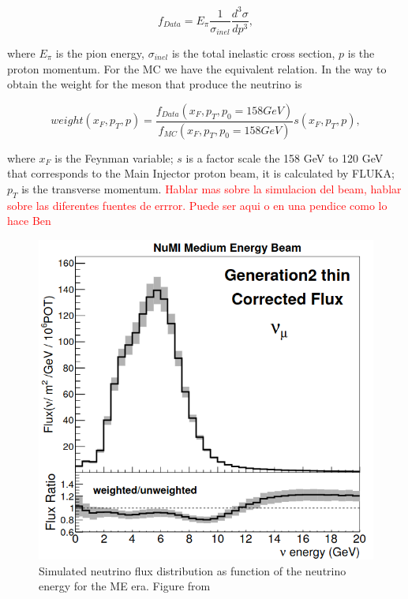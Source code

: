 \begin{equation}
    f_{Data}=E_\pi\frac{1}{\sigma_{inel}}\frac{d^3\sigma}{dp^3},
\end{equation}

where $E_\pi$ is the pion energy, $\sigma_{inel}$ is the total inelastic cross section, $p$ is the proton momentum. For the MC we have the equivalent relation. In the way to obtain the weight for the meson that produce the neutrino is 

\begin{equation}
    weight(x_F,p_T,p) = \frac{f_{Data}(x_F,p_T,p_0=158 GeV)}{f_{MC}(x_F,p_T,p_0=158 GeV)}s(x_F,p_T,p),
\end{equation}

where $x_F$ is the Feynman variable; $s$ is a factor scale the 158 GeV to 120 GeV that corresponds to the Main Injector proton beam, it is calculated by FLUKA\cite{Fluka}; $p_T$ is the transverse momentum. 
\textcolor{red}{Hablar mas sobre la simulacion del beam, hablar sobre las diferentes fuentes de errror.  Puede ser aqui o en una pendice como lo hace Ben}
 
\begin{figure}
    \centering
    \includegraphics[scale=0.3]{Figures/Chapter3/FluxDistribution.png}
    \caption{Simulated neutrino flux distribution as function of the neutrino energy for the ME era. Figure from \cite{LeoThesis}}
    \label{fig:Simulation:Beam:FluxDistribution}
\end{figure}

